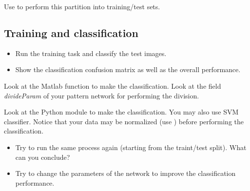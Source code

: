 \begin{pcomment}
\begin{premark}Use  to perform this partition into training/test sets.
\end{premark}
\end{pcomment}


\subsection{Training and classification}
\begin{qbox}
\begin{itemize}
	\item Run the training task and classify the test images.
	\item Show the classification confusion matrix as well as the overall performance.
\end{itemize}
\end{qbox}

\begin{mcomment}
\begin{mremark}
Look at the Matlab function  to make the classification.  Look at the field \textsl{divideParam} of your pattern network for performing the division.
\end{mremark}
\end{mcomment}

\begin{pcomment}
\begin{premark}
Look at the Python module  to make the classification. You may also use SVM classifier. Notice that your data may be normalized (use ) before performing the classification.
\end{premark}
\end{pcomment}


\begin{qbox}
\begin{itemize}
 	\item Try to run the same process again (starting from the traint/test split). What can you conclude?
	\item Try to change the parameters of the network to improve the classification performance.
\end{itemize}
\end{qbox}

